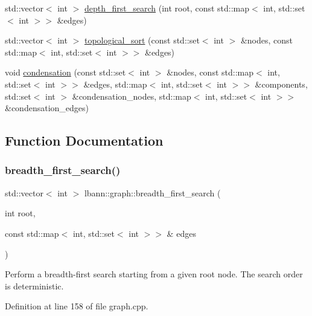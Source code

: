 \begin{DoxyCompactItemize}
std\+::vector$<$ int $>$ \hyperlink{namespacelbann_1_1graph_a44394207f3566604f867382b10aaf974}{depth\+\_\+first\+\_\+search} (int root, const std\+::map$<$ int, std\+::set$<$ int $>$$>$ \&edges)
\item 
std\+::vector$<$ int $>$ \hyperlink{namespacelbann_1_1graph_aeb19a22d8fac402df104ed8d547a10ee}{topological\+\_\+sort} (const std\+::set$<$ int $>$ \&nodes, const std\+::map$<$ int, std\+::set$<$ int $>$$>$ \&edges)
\item 
void \hyperlink{namespacelbann_1_1graph_ae06c3de1931d3786348995d870b792ca}{condensation} (const std\+::set$<$ int $>$ \&nodes, const std\+::map$<$ int, std\+::set$<$ int $>$$>$ \&edges, std\+::map$<$ int, std\+::set$<$ int $>$$>$ \&components, std\+::set$<$ int $>$ \&condensation\+\_\+nodes, std\+::map$<$ int, std\+::set$<$ int $>$$>$ \&condensation\+\_\+edges)
\end{DoxyCompactItemize}


\subsection{Function Documentation}
\mbox{\label{namespacelbann_1_1graph_a6cc9ff6e6b9707deaa1c77c3b8eb0b20}} 
\subsubsection{\texorpdfstring{breadth\+\_\+first\+\_\+search()}{breadth\_first\_search()}}
{\footnotesize\ttfamily std\+::vector$<$ int $>$ lbann\+::graph\+::breadth\+\_\+first\+\_\+search (\begin{DoxyParamCaption}\item[{int}]{root,  }\item[{const std\+::map$<$ int, std\+::set$<$ int $>$$>$ \&}]{edges }\end{DoxyParamCaption})}

Perform a breadth-\/first search starting from a given root node. The search order is deterministic. 

Definition at line 158 of file graph.\+cpp.


